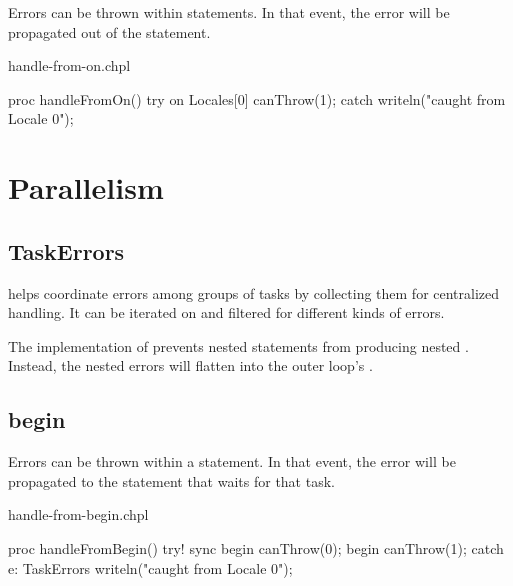 Errors can be thrown within  statements. In that event, the error
will be propagated out of the  statement.

\begin{chapelexample}{handle-from-on.chpl}
\begin{chapel}
proc handleFromOn() {
  try {
    on Locales[0] {
      canThrow(1);
    }
  } catch {
    writeln("caught from Locale 0");
  }
}
\end{chapel}
\begin{chapelpost}
\end{chapelpost}
\begin{chapeloutput}
\end{chapeloutput}
\end{chapelexample}

\section{Parallelism}
\label{Errors_Parallelism}

\subsection{TaskErrors}
\label{TaskErrors}

 helps coordinate errors among groups of tasks by collecting
them for centralized handling. It can be iterated on and filtered for
different kinds of errors.

The implementation of  prevents nested 
statements from producing nested . Instead, the nested
errors will flatten into the outer loop's .

\subsection{begin}
\label{Errors_begin}

Errors can be thrown within a  statement. In that event, the error
will be propagated to the  statement that waits for that task.

\begin{chapelexample}{handle-from-begin.chpl}
\begin{chapel}
proc handleFromBegin() {
  try! {
    sync {
      begin canThrow(0);
      begin canThrow(1);
    }
  } catch e: TaskErrors {
    writeln("caught from Locale 0");
  }
}
\end{chapel}
\begin{chapelpost}
\end{chapelpost}
\begin{chapeloutput}
\end{chapeloutput}
\end{chapelexample}

